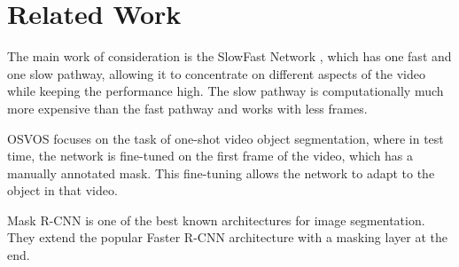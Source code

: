 \section{Related Work}
The main work of consideration is the SlowFast Network \cite{slow_fast}, which has one fast and one slow pathway, allowing it to concentrate on different aspects of the video while keeping the performance high. The slow pathway is computationally much more expensive than the fast pathway and works with less frames. 

OSVOS \cite{osvos} focuses on the task of one-shot video object segmentation, where in test time, the network is fine-tuned on the first frame of the video, which has a manually annotated mask. This fine-tuning allows the network to adapt to the object in that video. 

Mask R-CNN \cite{mask_rcnn} is one of the best known architectures for image segmentation. They extend the popular Faster R-CNN architecture with a masking layer at the end.